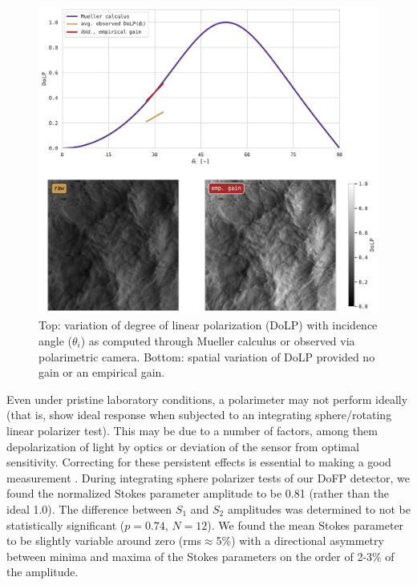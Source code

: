 \documentclass[letterpaper,journal]{IEEEtran}
\begin{document}
\begin{figure}[!ht]
    \centering
    \includegraphics[width=\textwidth]{_figures/DoLP_AOI_gain_example.pdf}
    \vspace{-20pt}
\caption{Top: variation of degree of linear polarization (DoLP) with incidence angle ($\theta_i$) as computed through Mueller calculus or observed via polarimetric camera. Bottom: spatial variation of DoLP provided no gain or an empirical gain.}
\vspace{-15pt}
\label{fig:DoLP_AOI_gain_example}
\end{figure}

\newpage

Even under pristine laboratory conditions, a polarimeter may not perform ideally (that is, show ideal response when subjected to an integrating sphere/rotating linear polarizer test). This may be due to a number of factors, among them depolarization of light by optics or deviation of the sensor from optimal sensitivity. Correcting for these persistent effects is essential to making a good measurement \cite{Zappa2012,Laxague2018b,laxague_suppression_2024,laxague_effects_2025}. During integrating sphere polarizer tests of our DoFP detector, we found the normalized Stokes parameter amplitude to be 0.81 (rather than the ideal 1.0). The difference between $S_1$ and $S_2$ amplitudes was determined to not be statistically significant ($p=0.74$, $N=12$). We found the mean Stokes parameter to be slightly variable around zero (rms$\approx$5\%) with a directional asymmetry between minima and maxima of the Stokes parameters on the order of 2-3\% of the amplitude.
\end{document}
